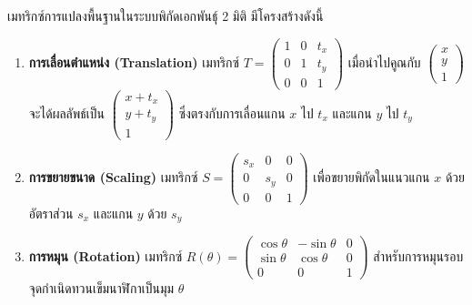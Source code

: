 เมทริกซ์การแปลงพื้นฐานในระบบพิกัดเอกพันธุ์ 2 มิติ มีโครงสร้างดังนี้
\begin{enumerate}
    \item \textbf{การเลื่อนตำแหน่ง (Translation)} เมทริกซ์ $T = \begin{pmatrix} 1 & 0 & t_x \\ 0 & 1 & t_y \\ 0 & 0 & 1 \end{pmatrix}$ เมื่อนำไปคูณกับ $\begin{pmatrix} x \\ y \\ 1 \end{pmatrix}$ จะได้ผลลัพธ์เป็น $\begin{pmatrix} x + t_x \\ y + t_y \\ 1 \end{pmatrix}$ ซึ่งตรงกับการเลื่อนแกน $x$ ไป $t_x$ และแกน $y$ ไป $t_y$
    \item \textbf{การขยายขนาด (Scaling)} เมทริกซ์ $S = \begin{pmatrix} s_x & 0 & 0 \\ 0 & s_y & 0 \\ 0 & 0 & 1 \end{pmatrix}$ เพื่อขยายพิกัดในแนวแกน $x$ ด้วยอัตราส่วน $s_x$ และแกน $y$ ด้วย $s_y$
    \item \textbf{การหมุน (Rotation)} เมทริกซ์ $R(\theta) = \begin{pmatrix} \cos\theta & -\sin\theta & 0 \\ \sin\theta & \cos\theta & 0 \\ 0 & 0 & 1 \end{pmatrix}$ สำหรับการหมุนรอบจุดกำเนิดทวนเข็มนาฬิกาเป็นมุม $\theta$
\end{enumerate}

